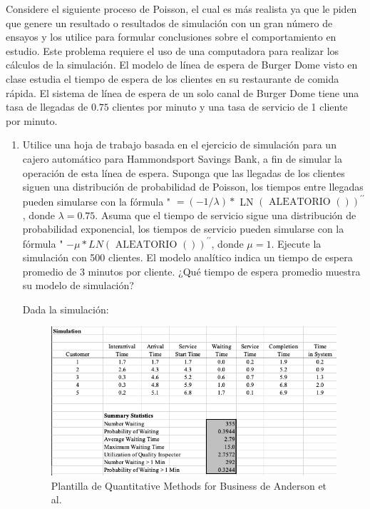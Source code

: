 \begin{problema}
	Considere el siguiente proceso de Poisson, el cual es más realista ya que le piden que genere un resultado o resultados de simulación con un gran número de ensayos y los utilice para formular conclusiones sobre el comportamiento en estudio. Este problema requiere el uso de una computadora para realizar los cálculos de la simulación.
	El modelo de línea de espera de Burger Dome visto en clase estudia el tiempo de espera de los clientes en su restaurante de comida rápida. El sistema de línea de espera de un solo canal de Burger Dome tiene una tasa de llegadas de $0.75$ clientes por minuto y una tasa de servicio de 1 cliente por minuto.
	
	
	\begin{enumerate}
		\item  Utilice una hoja de trabajo basada en el ejercicio de simulación para un cajero automático para Hammondsport Savings Bank, a fin de simular la operación de esta línea de espera. Suponga que las llegadas de los clientes siguen una distribución de probabilidad de Poisson, los tiempos entre llegadas pueden simularse con la fórmula " $=(-1 / \lambda) *$ LN $(\text { ALEATORIO }())^{\prime \prime}$, donde $\lambda=0.75 .$ Asuma que el tiempo de servicio sigue una distribución de probabilidad exponencial, los tiempos de servicio pueden simularse con la fórmula " $-\mu * L N(\text { ALEATORIO }())^{\prime \prime}$, donde $\mu=1$. Ejecute la simulación con 500 clientes. El modelo analítico indica un tiempo de espera promedio de 3 minutos por cliente. ¿Qué tiempo de espera promedio muestra su modelo de simulación?
		\begin{sol}
			Dada la simulación: 
			\begin{figure}[H]
				\centering
				\includegraphics[scale=0.5]{Images/2.1}
				\caption{Plantilla de Quantitative Methods for Business de Anderson et al. }

\end{figure}
\end{sol}
\end{enumerate}
\end{problema}
